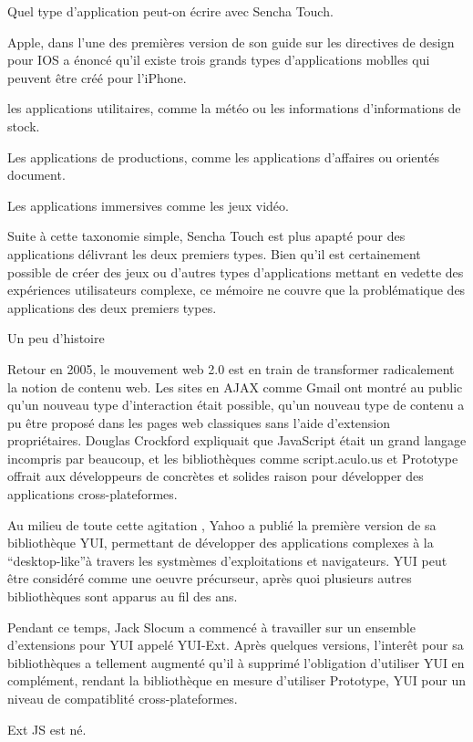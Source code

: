 Quel type d’application peut-on écrire avec Sencha Touch.

Apple, dans l’une des premières version de son guide sur les directives de design pour IOS a énoncé qu’il existe trois grands types d’applications moblles qui peuvent être créé pour l’iPhone.

    les applications utilitaires, comme la météo ou les informations d’informations de stock.

    Les applications de productions, comme les applications d’affaires ou orientés document.

    Les applications immersives comme les jeux vidéo.

Suite à cette taxonomie simple, Sencha Touch est plus apapté pour des applications délivrant les deux premiers types. Bien qu’il est certainement possible de créer des jeux ou d’autres types d’applications mettant en vedette des expériences utilisateurs complexe, ce mémoire ne couvre que la problématique des applications des deux premiers types.

Un peu d’histoire

Retour en 2005, le mouvement web 2.0 est en train de transformer radicalement la notion de contenu web. Les sites en AJAX comme Gmail ont montré au public qu’un nouveau type d’interaction était possible, qu’un nouveau type de contenu a pu être proposé dans les pages web classiques sans l’aide d'extension propriétaires. Douglas Crockford expliquait que JavaScript était un grand langage incompris par beaucoup, et les bibliothèques comme script.aculo.us et Prototype offrait aux développeurs de concrètes et solides raison pour développer des applications cross-plateformes.

Au milieu de toute cette agitation , Yahoo a publié la première version de sa bibliothèque YUI, permettant de développer des applications complexes à la “desktop-like”à travers les systmèmes d’exploitations et navigateurs. YUI peut être considéré comme une oeuvre précurseur, après quoi plusieurs autres bibliothèques sont apparus au fil des ans.

Pendant ce temps, Jack Slocum a commencé à travailler sur un ensemble d’extensions pour YUI appelé YUI-Ext. Après quelques versions, l’interêt pour sa bibliothèques a tellement augmenté qu’il à supprimé l’obligation d’utiliser YUI en complément, rendant la bibliothèque en mesure d’utiliser Prototype, YUI pour un niveau de compatiblité cross-plateformes.

Ext JS est né.

